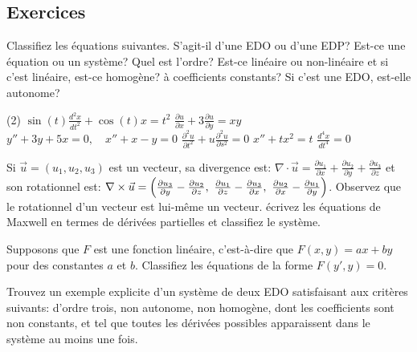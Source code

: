 \subsection{Exercices}

\begin{exercise}
	Classifiez les équations suivantes. S'agit-il d'une EDO ou d'une EDP?
	Est-ce une équation ou un système?  Quel est l'ordre?
	Est-ce linéaire ou non-linéaire et si c'est linéaire, est-ce homogène?
	à coefficients constants?  Si c'est une EDO, est-elle autonome?
	\begin{tasks}(2)
	\task $\displaystyle \sin(t) \frac{d^2 x}{dt^2} + \cos(t) x = t^2$
	\task $\displaystyle \frac{\partial u}{\partial x} + 3 \frac{\partial u}{\partial y} = xy$
	\task $\displaystyle y''+3y+5x=0, \quad x''+x-y=0$
	\task $\displaystyle \frac{\partial^2 u}{\partial t^2} + u\frac{\partial^2 u}{\partial s^2} = 0$
	\task $\displaystyle x''+tx^2=t$
	\task $\displaystyle \frac{d^4 x}{dt^4} = 0$
	\end{tasks}
\end{exercise}

\begin{exercise}
Si $\vec{u} = (u_1,u_2,u_3)$ est un vecteur, sa divergence est:
$\nabla \cdot \vec{u} =
	\frac{\partial u_1}{\partial x}
	+ \frac{\partial u_2}{\partial y}
	+ \frac{\partial u_3}{\partial z}$ et son rotationnel est:
	$\nabla \times \vec{u} =
		\Bigl(	\frac{\partial u_3}{\partial y} - \frac{\partial u_2}{\partial z} , ~
				\frac{\partial u_1}{\partial z} - \frac{\partial u_3}{\partial x} , ~
				\frac{\partial u_2}{\partial x} - \frac{\partial u_1}{\partial y} \Bigr)$.
Observez que le rotationnel d'un vecteur est lui-même un vecteur.
écrivez les équations de Maxwell en termes de dérivées partielles et classifiez le système.
\end{exercise}

\begin{exercise}
	Supposons que $F$ est une fonction linéaire, c'est-à-dire que $F(x,y) = ax+by$
	pour des constantes $a$ et $b$.  Classifiez les équations de la forme $F(y',y) = 0$.
\end{exercise}

\begin{exercise}
	Trouvez un exemple explicite d'un système de deux EDO satisfaisant aux critères suivants:
	d'ordre trois, non autonome, non homogène, dont les coefficients sont non constants,
	et tel que toutes les dérivées possibles apparaissent dans le système au moins une fois.
\end{exercise}

